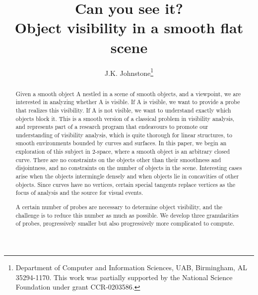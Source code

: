 \documentclass[10pt]{article}
\title{Can you see it?\\Object visibility in a smooth flat scene}
\author{J.K. Johnstone\thanks{Department of Computer and 
    Information Sciences, UAB, Birmingham, AL 35294-1170.  This work
    was partially supported by the National Science Foundation under grant CCR-0203586.}}
\begin{document}
\maketitle

\begin{abstract}
Given a smooth object A nestled in a scene of smooth objects, and
a viewpoint, we are interested in analyzing whether A is visible.
If A is visible, we want to provide a probe that realizes this visibility.
If A is not visible, we want to understand exactly which objects block it.
This is a smooth version of a classical problem in visibility analysis,
and represents part of a research program that endeavours to promote
our understanding of visibility analysis, which is quite thorough for linear structures,
to smooth environments bounded by curves and surfaces.
In this paper, we begin an exploration of this subject 
in 2-space, where a smooth object is an arbitrary closed curve.
There are no constraints on the objects other than their smoothness and disjointness,
and no constraints on the number of objects in the scene.
Interesting cases arise when the objects intermingle densely and when objects
lie in concavities of other objects.
Since curves have no vertices, certain special tangents replace vertices
as the focus of analysis and the source for visual events.

A certain number of probes are necessary to determine object visibility,
and the challenge is to reduce this number as much as possible.
We develop three granularities of probes, progressively smaller but
also progressively more complicated to compute.
\end{abstract}
\end{document}
